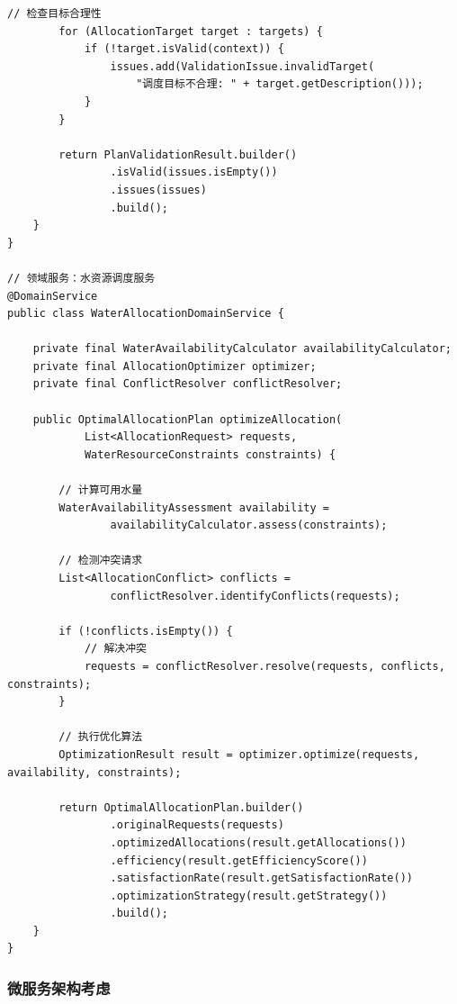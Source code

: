 \begin{lstlisting}[style=java]
        // 检查目标合理性
        for (AllocationTarget target : targets) {
            if (!target.isValid(context)) {
                issues.add(ValidationIssue.invalidTarget(
                    "调度目标不合理: " + target.getDescription()));
            }
        }
        
        return PlanValidationResult.builder()
                .isValid(issues.isEmpty())
                .issues(issues)
                .build();
    }
}

// 领域服务：水资源调度服务
@DomainService
public class WaterAllocationDomainService {
    
    private final WaterAvailabilityCalculator availabilityCalculator;
    private final AllocationOptimizer optimizer;
    private final ConflictResolver conflictResolver;
    
    public OptimalAllocationPlan optimizeAllocation(
            List<AllocationRequest> requests, 
            WaterResourceConstraints constraints) {
        
        // 计算可用水量
        WaterAvailabilityAssessment availability = 
                availabilityCalculator.assess(constraints);
        
        // 检测冲突请求
        List<AllocationConflict> conflicts = 
                conflictResolver.identifyConflicts(requests);
        
        if (!conflicts.isEmpty()) {
            // 解决冲突
            requests = conflictResolver.resolve(requests, conflicts, constraints);
        }
        
        // 执行优化算法
        OptimizationResult result = optimizer.optimize(requests, availability, constraints);
        
        return OptimalAllocationPlan.builder()
                .originalRequests(requests)
                .optimizedAllocations(result.getAllocations())
                .efficiency(result.getEfficiencyScore())
                .satisfactionRate(result.getSatisfactionRate())
                .optimizationStrategy(result.getStrategy())
                .build();
    }
}
\end{lstlisting}

\hypertarget{ux5faeux670dux52a1ux67b6ux6784ux8003ux8651}{%
\subsubsection{微服务架构考虑}\label{ux5faeux670dux52a1ux67b6ux6784ux8003ux8651}}

